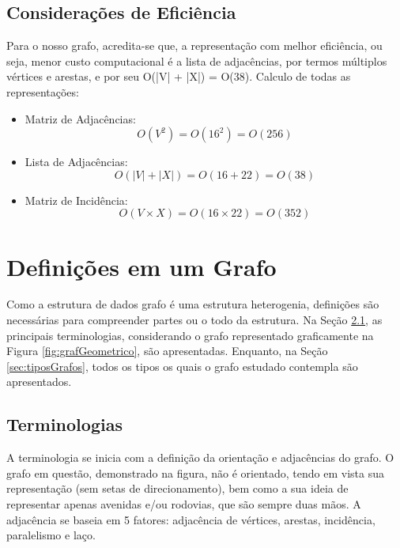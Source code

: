 \section{Considerações de Eficiência}\label{sec:eficienciaRepresentacao}
Para o nosso grafo, acredita-se que, a representação com melhor eficiência, ou seja, menor custo computacional é a lista de adjacências, por termos múltiplos vértices e arestas, e por seu O(|V| + |X|) = O(38). Calculo de todas as representações:
\begin{itemize}
	\item Matriz de Adjacências:\\
	      \begin{equation}
		      O(V^2) = O(16^2) = O(256)
	      \end{equation}
	\item Lista de Adjacências: \\
	      \begin{equation}
		      O(|V| + |X|) = O(16 + 22) = O(38)
	      \end{equation}
	\item Matriz de Incidência:
	      \begin{equation}
		      O(V\times X) = O(16\times22) = O(352)
	      \end{equation}
\end{itemize}

\chapter{Definições em um Grafo }\label{cap:definicoesGrafo}

Como a estrutura de dados grafo é uma estrutura heterogenia, definições são necessárias para compreender partes ou o todo da estrutura. Na Seção \ref{sec:terminologias}, as principais terminologias, considerando o grafo representado graficamente na Figura  \ref{fig:grafGeometrico}, são apresentadas. Enquanto, na Seção \ref{sec:tiposGrafos}, todos os tipos os quais o grafo estudado contempla são apresentados.

\section{Terminologias}\label{sec:terminologias}

A terminologia se inicia com a definição da orientação e adjacências do grafo.
O grafo em questão, demonstrado na figura, não é orientado, tendo em vista sua representação (sem setas de direcionamento), bem como a sua ideia de representar apenas avenidas e/ou rodovias, que são sempre duas mãos.
A adjacência se baseia em 5 fatores: adjacência de vértices, arestas, incidência, paralelismo e laço.

